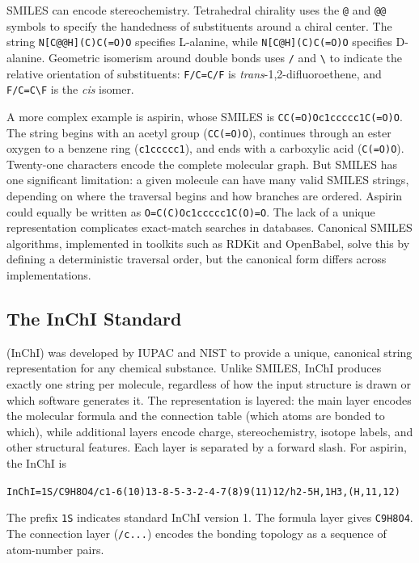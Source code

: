 SMILES can encode stereochemistry. Tetrahedral chirality uses the \texttt{@} and \texttt{@@} symbols to specify the handedness of substituents around a chiral center. The string \texttt{N[C@@H](C)C(=O)O} specifies L-alanine, while \texttt{N[C@H](C)C(=O)O} specifies D-alanine. Geometric isomerism around double bonds uses \texttt{/} and \texttt{\textbackslash} to indicate the relative orientation of substituents: \texttt{F/C=C/F} is \textit{trans}-1,2-difluoroethene, and \texttt{F/C=C\textbackslash F} is the \textit{cis} isomer.

A more complex example is aspirin, whose SMILES is \texttt{CC(=O)Oc1ccccc1C(=O)O}. The string begins with an acetyl group (\texttt{CC(=O)O}), continues through an ester oxygen to a benzene ring (\texttt{c1ccccc1}), and ends with a carboxylic acid (\texttt{C(=O)O}). Twenty-one characters encode the complete molecular graph. But SMILES has one significant limitation: a given molecule can have many valid SMILES strings, depending on where the traversal begins and how branches are ordered. Aspirin could equally be written as \texttt{O=C(C)Oc1ccccc1C(O)=O}. The lack of a unique representation complicates exact-match searches in databases. Canonical SMILES algorithms, implemented in toolkits such as RDKit and OpenBabel, solve this by defining a deterministic traversal order, but the canonical form differs across implementations.


\subsection{The InChI Standard}
\label{sec:inchi}

 (InChI) was developed by IUPAC and NIST to provide a unique, canonical string representation for any chemical substance. Unlike SMILES, InChI produces exactly one string per molecule, regardless of how the input structure is drawn or which software generates it. The representation is layered: the main layer encodes the molecular formula and the connection table (which atoms are bonded to which), while additional layers encode charge, stereochemistry, isotope labels, and other structural features. Each layer is separated by a forward slash. For aspirin, the InChI is
\begin{center}
\texttt{InChI=1S/C9H8O4/c1-6(10)13-8-5-3-2-4-7(8)9(11)12/h2-5H,1H3,(H,11,12)}
\end{center}
The prefix \texttt{1S} indicates standard InChI version 1. The formula layer gives \texttt{C9H8O4}. The connection layer (\texttt{/c...}) encodes the bonding topology as a sequence of atom-number pairs.

